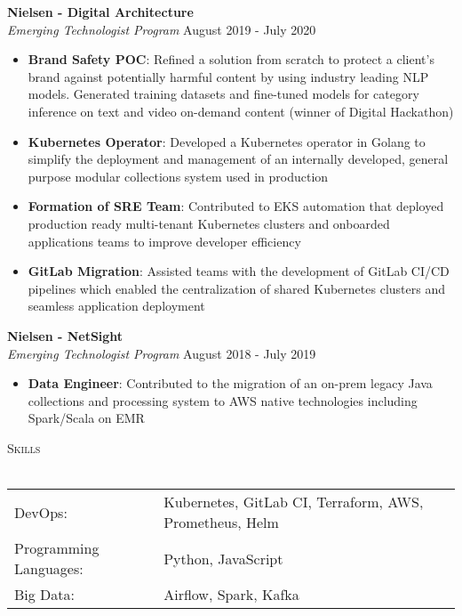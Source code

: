 \documentclass[a4paper]{article}
\newcommand{\lineunder} {
    \vspace*{-8pt} \\
    \hspace*{-18pt} \hrulefill \\
}
\newcommand{\header} [1] {
    {\hspace*{-18pt}\vspace*{6pt} \textsc{#1}}
    \vspace*{-6pt} \lineunder
}
\begin{document}
\textbf{Nielsen - Digital Architecture}\\
\textit{Emerging Technologist Program} \hfill August 2019 - July 2020\\
\vspace{-1mm}
\begin{itemize} \itemsep 1pt
	\item \textbf{Brand Safety POC}: Refined a solution from scratch to protect a client's brand against potentially harmful content by using industry leading NLP models. Generated training datasets and fine-tuned models for category inference on text and video on-demand content (winner of Digital Hackathon)
    \item \textbf{Kubernetes Operator}: Developed a Kubernetes operator in Golang to simplify the deployment and management of an internally developed, general purpose modular collections system used in production
    \item \textbf{Formation of SRE Team}: Contributed to EKS automation that deployed production ready multi-tenant Kubernetes clusters and onboarded applications teams to improve developer efficiency
    \item \textbf{GitLab Migration}: Assisted teams with the development of GitLab CI/CD pipelines which enabled the centralization of shared Kubernetes clusters and seamless application deployment
\end{itemize}

\textbf{Nielsen - NetSight}\\
\textit{Emerging Technologist Program} \hfill August 2018 - July 2019\\
\vspace{-1mm}
\begin{itemize} \itemsep 1pt
	\item \textbf{Data Engineer}: Contributed to the migration of an on-prem legacy Java collections and processing system to AWS native technologies including Spark/Scala on EMR
\end{itemize}

\header{Skills}
\vspace*{1mm}
\begin{tabular}{ l l }
	DevOps:                & Kubernetes, GitLab CI, Terraform, AWS, Prometheus, Helm                \\
	Programming Languages: & Python, JavaScript                                                     \\
	Big Data:              & Airflow, Spark, Kafka                                                  \\
\end{tabular}
\vspace{3mm}
\end{document}
